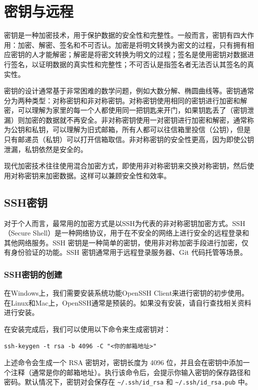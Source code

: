 \chapter{密钥与远程}\label{chap:secret-key}

密钥是一种加密技术，用于保护数据的安全性和完整性。一般而言，密钥有四大作用：加密、解密、签名和不可否认。加密是将明文转换为密文的过程，只有拥有相应密钥的人才能解密；解密是将密文转换为明文的过程；签名是使用密钥对数据进行签名，以证明数据的真实性和完整性；不可否认是指签名者无法否认其签名的真实性。

密钥的设计通常基于非常困难的数学问题，例如大数分解、椭圆曲线等。密钥通常分为两种类型：对称密钥和非对称密钥。对称密钥使用相同的密钥进行加密和解密，可以理解为家里的每一个人都使用同一把钥匙来开门，如果钥匙丢了（密钥泄漏）则加密的数据就不再安全。非对称密钥使用一对密钥进行加密和解密，通常称为公钥和私钥，可以理解为旧式邮箱，所有人都可以往信箱里投信（公钥），但是只有邮递员（私钥）可以打开信箱取信。非对称密钥的安全性更高，因为即使公钥泄漏，私钥依然是安全的。

现代加密技术往往使用混合加密方式，即使用非对称密钥来交换对称密钥，然后使用对称密钥来加密数据。这样可以兼顾安全性和效率。



\section{SSH密钥}\label{sec:ssh-key}

对于个人而言，最常用的加密方式是以SSH为代表的非对称密钥加密方式。SSH（Secure Shell）是一种网络协议，用于在不安全的网络上进行安全的远程登录和其他网络服务。SSH 密钥是一种简单的密钥，使用非对称加密手段进行加密，仅有身份验证的功能。SSH 密钥通常用于远程登录服务器、Git 代码托管等场景。

\subsection{SSH密钥的创建}

在Windows上，我们需要安装系统功能OpenSSH Client来进行密钥的初步使用。在Linux和Mac上，OpenSSH通常是预装的。如果没有安装，请自行查找相关资料进行安装。

在安装完成后，我们可以使用以下命令来生成密钥对：
\begin{verbatim}
ssh-keygen -t rsa -b 4096 -C "<你的邮箱地址>"
\end{verbatim}

上述命令会生成一个 RSA 密钥对，密钥长度为 4096 位，并且会在密钥中添加一个注释（通常是你的邮箱地址）。执行该命令后，会提示你输入密钥的保存路径和密码。默认情况下，密钥对会保存在  \texttt{\textasciitilde/.ssh/id\_rsa}  和  \texttt{\textasciitilde/.ssh/id\_rsa.pub}  中。

